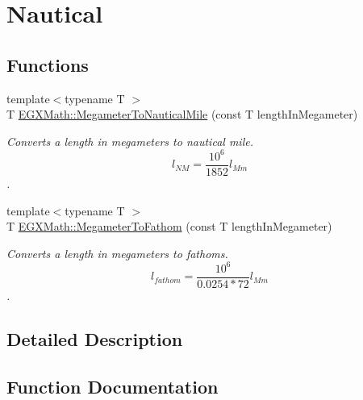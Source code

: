 \hypertarget{group___e_g_x_math-_conversions-_length_conversions-_s_i-_megameter-_nautical}{}\section{Nautical}
\label{group___e_g_x_math-_conversions-_length_conversions-_s_i-_megameter-_nautical}
\subsection*{Functions}
\begin{DoxyCompactItemize}
\item 
{\footnotesize template$<$typename T $>$ }\\T \mbox{\hyperlink{group___e_g_x_math-_conversions-_length_conversions-_s_i-_megameter-_nautical_ga483b575b1654e1d0f6ea1fac63b5f54e}{E\+G\+X\+Math\+::\+Megameter\+To\+Nautical\+Mile}} (const T length\+In\+Megameter)
\begin{DoxyCompactList}\small\item\em Converts a length in megameters to nautical mile. \[ l_{NM}= \frac{10^{6}}{1852} l_{Mm} \]. \end{DoxyCompactList}\item 
{\footnotesize template$<$typename T $>$ }\\T \mbox{\hyperlink{group___e_g_x_math-_conversions-_length_conversions-_s_i-_megameter-_nautical_ga7149d3c252ab9459f8caad7b054f0601}{E\+G\+X\+Math\+::\+Megameter\+To\+Fathom}} (const T length\+In\+Megameter)
\begin{DoxyCompactList}\small\item\em Converts a length in megameters to fathoms. \[ l_{fathom}= \frac{10^{6}}{0.0254 * 72} l_{Mm} \]. \end{DoxyCompactList}\end{DoxyCompactItemize}


\subsection{Detailed Description}


\subsection{Function Documentation}
\mbox{\label{group___e_g_x_math-_conversions-_length_conversions-_s_i-_megameter-_nautical_ga7149d3c252ab9459f8caad7b054f0601}} 
